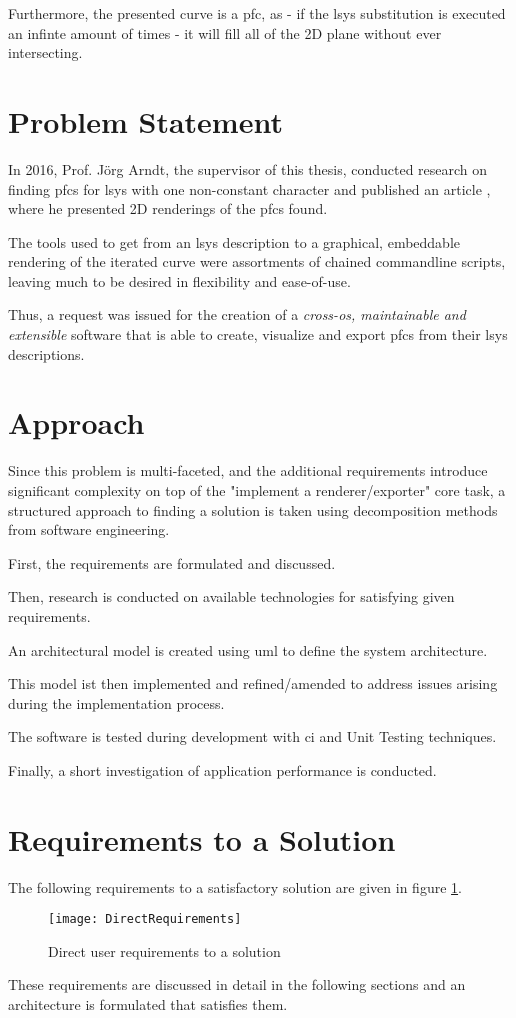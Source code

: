 Furthermore, the presented curve is a \gls{pfc}, as - if the \gls{lsys} substitution is executed an infinte amount of times - it will fill all of the 2D plane without ever intersecting.

\section{Problem Statement}
In 2016, Prof. Jörg Arndt, the supervisor of this thesis, conducted research on finding \gls{pfc}s for \gls{lsys} with one non-constant character and published an article \citep{Arndt2016}, where he presented 2D renderings of the \gls{pfc}s found.

The tools used to get from an \gls{lsys} description to a graphical, embeddable rendering of the iterated curve were assortments of chained commandline scripts, leaving much to be desired in flexibility and ease-of-use.

Thus, a request was issued for the creation of a \emph{cross-\gls{os}, maintainable and extensible} software that is able to create, visualize and export \gls{pfc}s from their \gls{lsys} descriptions.

\section{Approach}

Since this problem is multi-faceted, and the additional requirements introduce significant complexity on top of the "implement a renderer/exporter" core task, a structured approach to finding a solution is taken using decomposition methods from software engineering.

First, the requirements are formulated and discussed.

Then, research is conducted on available technologies for satisfying given requirements.

An architectural model is created using \gls{uml} to define the system architecture.

This model ist then implemented and refined/amended to address issues arising during the implementation process.

The software is tested during development with \gls{ci} and \gls{Unit Testing} techniques.

Finally, a short investigation of application performance is conducted.

\section{Requirements to a Solution}
The following requirements to a satisfactory solution are given in figure \ref{img1}.

\begin{figure}[h]
	\texttt{[image: DirectRequirements]}
	\caption{Direct user requirements to a solution}
	\label{img1}
\end{figure}

These requirements are discussed in detail in the following sections and an architecture is formulated that satisfies them.
